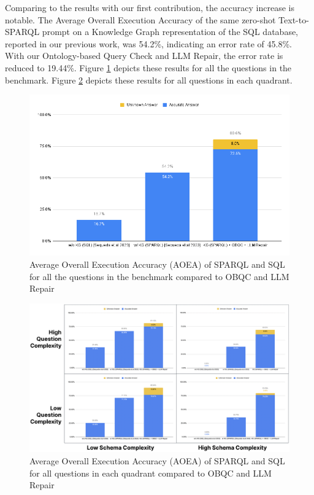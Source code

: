 \documentclass[11pt]{article}
\begin{document}
Comparing to the results with our first contribution, the accuracy increase is notable. The Average Overall Execution Accuracy of the same zero-shot Text-to-SPARQL prompt on a Knowledge Graph representation of the SQL database, reported in our previous work, was 54.2\%, indicating an error rate of 45.8\%. 
With our Ontology-based Query Check and LLM Repair, the error rate is reduced to 19.44\%. 
Figure \ref{fig:OverallResultsWithPrevious} depicts these results for all the questions in the benchmark.
Figure \ref{fig:QuadrantResultsWithPrevious} depicts these results for all questions in each quadrant.

\begin{figure}[hbtp]
\centering
\includegraphics[scale=0.5]{submissions/Juan2024/results/OverallResultsWithPrevious.png}
\caption{Average Overall Execution Accuracy (AOEA) of SPARQL and SQL for all the questions in the benchmark compared to OBQC and LLM Repair}
\label{fig:OverallResultsWithPrevious}
\end{figure}

\begin{figure}[hbtp]
\centering
\includegraphics[scale=0.35]{submissions/Juan2024/results/QuadrantResultsWithPrevious.png}
\caption{Average Overall Execution Accuracy (AOEA) of SPARQL and SQL for all questions in each quadrant compared to OBQC and LLM Repair}
\label{fig:QuadrantResultsWithPrevious}
\end{figure}
\end{document}
